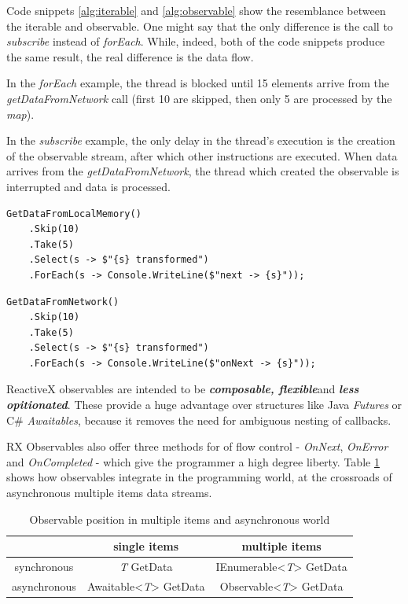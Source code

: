 \documentclass[12pt,a4paper,twoside]{report}
\begin{document}
Code snippets \ref{alg:iterable} and \ref{alg:observable} show the resemblance between the iterable and observable. One might say that the only difference is the call to \textit{subscribe} instead of \textit{forEach}. While, indeed, both of the code snippets produce the same result, the real difference is the data flow.

In the \textit{forEach} example, the thread is blocked until 15 elements arrive from the \textit{getDataFromNetwork} call (first 10 are skipped, then only 5 are processed by the \textit{map}).

In the \textit{subscribe} example, the only delay in the thread's execution is the creation of the observable stream, after which other instructions are executed. When data arrives from the \textit{getDataFromNetwork}, the thread which created the observable is interrupted and data is processed.

\newpage

\begin{lstlisting}[caption=Iterable, label=alg:iterable]
  GetDataFromLocalMemory()
    .Skip(10)
    .Take(5)
    .Select(s -> $"{s} transformed")
    .ForEach(s -> Console.WriteLine($"next -> {s}"));
\end{lstlisting}

\begin{lstlisting}[caption=Observable, label=alg:observable]
  GetDataFromNetwork()
    .Skip(10)
    .Take(5)
    .Select(s -> $"{s} transformed")
    .ForEach(s -> Console.WriteLine($"onNext -> {s}"));
\end{lstlisting}

ReactiveX observables are intended to be \textbf{\textit{composable, flexible}}and \textbf{\textit{less opitionated}}. These provide a huge advantage over structures like Java \textit{Futures} or C\# \textit{Awaitables}, because it removes the need for ambiguous nesting of callbacks.

RX Observables also offer three methods for of flow control - \textit{OnNext}, \textit{OnError} and \textit{OnCompleted} - which give the programmer a high degree liberty. Table \ref{table:rx} shows how observables integrate in the programming world, at the crossroads of asynchronous multiple items data streams.

\begin{table}[h]
  \centering
  \begin{tabular}{c | c | c}
    & single items & multiple items \\
    \hline
    synchronous & \textit{T} GetData & IEnumerable<\textit{T}> GetData \\
    asynchronous & Awaitable<\textit{T}> GetData & Observable<\textit{T}> GetData
  \end{tabular}
  \caption{Observable position in multiple items and asynchronous world}
  \label{table:rx}
\end{table}
\end{document}
